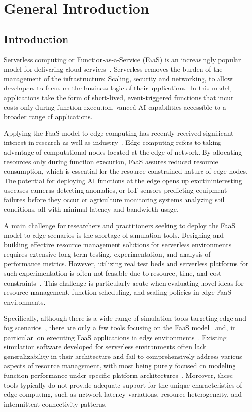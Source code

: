 \chapter{General Introduction}

\section{Introduction}

Serverless computing or Function-as-a-Service (FaaS) is an increasingly popular model for delivering cloud services~\cite{baldini2017serverless}. Serverless removes the burden of the management of the infrastructure: Scaling, security and networking, to allow developers to focus on the business logic of their applications. In this model, applications take the form of short-lived, event-triggered functions that incur costs only during function execution.  
vanced AI capabilities accessible to a broader range of applications.

Applying the FaaS model to edge computing has recently received significant interest in research as well as industry~\cite{aslanpour2021serverless}. Edge computing refers to taking advantage of computational nodes located at the edge of network. By allocating resources only during function execution, FaaS assures reduced resource consumption, which is essential for the resource-constrained nature of edge nodes. The potential for deploying AI functions at the edge opens up excitininteresting usecases cameras detecting anomalies, or IoT sensors predicting equipment failures before they occur or agriculture monitoring systems analyzing soil conditions, all with minimal latency and bandwidth usage.

A main challenge for researchers and practitioners seeking to deploy the FaaS model to edge scenarios is the shortage of simulation tools. Designing and building effective resource management solutions for serverless environments requires extensive long-term testing, experimentation, and analysis of performance metrics. However, utilizing real test beds and serverless platforms for such experimentation is often not feasible due to resource, time, and cost constraints~\cite{mampage2021cloudsimsc}. This challenge is particularly acute when evaluating novel ideas for resource management, function scheduling, and scaling policies in edge-FaaS environments.

Specifically, although there is a wide range of simulation tools targeting edge and fog scenarios~\cite{svorobej2019simulating}, there are only a few tools focusing on the FaaS model~\cite{mahmoudi2021simfaas} and, in particular, on executing FaaS applications in edge environments~\cite{jeon2019cloudsim}. Existing simulation software developed for serverless environments often lack generalizability in their architecture and fail to comprehensively address various aspects of resource management, with most being purely focused on modeling function performance under specific platform architectures~\cite{mampage2021cloudsimsc}. Moreover, these tools typically do not provide adequate support for the unique characteristics of edge computing, such as network latency variations, resource heterogeneity, and intermittent connectivity patterns.

